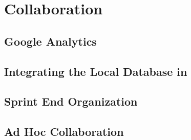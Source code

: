 \chapter{Collaboration}\label{chap:collaboration}


\section{Google Analytics}


\section{Integrating the Local Database in \launcher}\label{sec:collab:localdbtolauncher}


\section{Sprint End Organization}\label{sec:collab:sprintend}


\section{Ad Hoc Collaboration}\label{sec:collab:adhoc}

